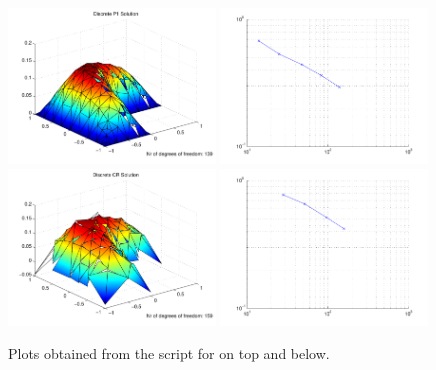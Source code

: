 \begin{figure}[ht!]
\includegraphics[width= 0.49\textwidth]{images/sect_QuickStart_LShapeU1}
\includegraphics[width= 0.49\textwidth]{images/sect_QuickStart_LShapeE1}\\
\includegraphics[width= 0.49\textwidth]{images/sect_QuickStart_LShapeU2}
\includegraphics[width= 0.49\textwidth]{images/sect_QuickStart_LShapeE2}
\caption{Plots obtained from the  script for  on top and  below.}\label{sect:Quickstart.fig.plots.gettingStarted}
\end{figure}

\clearpage
